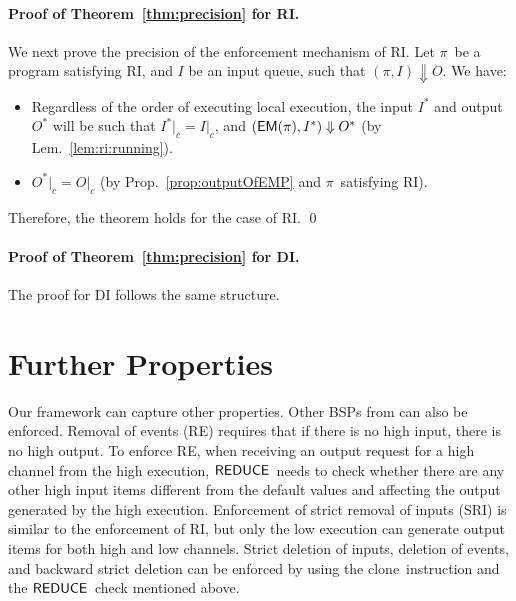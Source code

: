 \documentclass[10pt,a4paper,oneside]{article}
\def\execution#1#2#3{\ensuremath{(#1, #2)\Downarrow#3}}
\def\channeleq#1#2#3{\ensuremath{\restrict{#1}{#3} = \restrict{#2}{#3}}}
\def\restrict#1#2{\ensuremath{{#1}|_{#2}}}
\def\chnl{\ensuremath{c}}
\def\sanserif#1{\ensuremath{\sf #1}}
\def\REDUCE{\ensuremath{\sanserif{REDUCE}}}
\def\EM{\ensuremath{{\sanserif{EM}}}}
\def\Prog{\ensuremath{\pi}}
\def\EMP{\ensuremath{\EM(}\ensuremath{\Prog)}}
\def\NCLONE{clone}
\begin{document}
\paragraph{Proof of Theorem~\ref{thm:precision} for RI.}
We next prove the precision of the enforcement mechanism of RI. Let \Prog\ be a program satisfying RI, and $I$ be an input queue, such that $\execution{\Prog}{I}{O}$. We have:
\begin{itemize}
\item Regardless of the order of executing local execution, the input $I^*$ and output $O^*$ will be such that \channeleq{I^*}{I}{\chnl}, and \execution{\EMP}{I^*}{O^*} (by Lem.~\ref{lem:ri:running}).
\item \channeleq{O^*}{O}{\chnl} (by Prop.~\ref{prop:outputOfEMP} and \Prog\ satisfying RI).
\end{itemize}

Therefore, the theorem holds for the case of RI. \qed



\paragraph{Proof of Theorem~\ref{thm:precision} for DI.}
The proof for DI follows the same structure.



\section{Further Properties}\label{sec:discussion}

Our framework can capture other properties. Other BSPs from \cite{MANT-00-CSF} can also be enforced. Removal of events (RE) requires that if there is no high input, there is no high output. To enforce RE, when receiving an output request for a high channel from the high execution, \REDUCE\ needs to check whether there are any other high input items different from the default values and affecting the output generated by the high execution. Enforcement of strict removal of inputs (SRI) is similar to the enforcement of RI, but only the low execution can generate output items for both high and low channels. Strict deletion of inputs, deletion of events, and backward strict deletion can be enforced by using the \NCLONE\ instruction and the \REDUCE\ check mentioned above.
\end{document}
